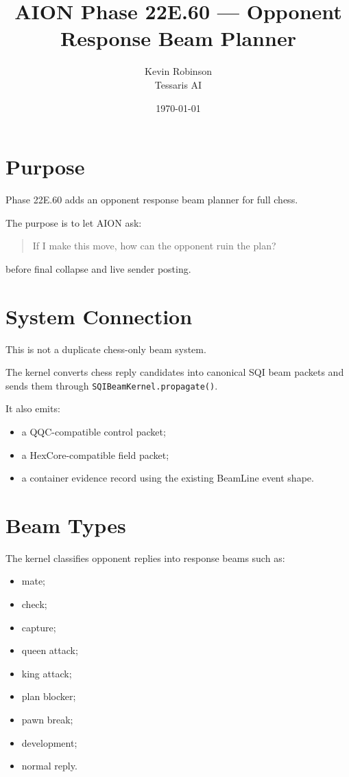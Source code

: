 \documentclass[11pt,a4paper]{article}
\title{\textbf{AION Phase 22E.60 --- Opponent Response Beam Planner}}
\author{Kevin Robinson\\Tessaris AI}
\date{\today}
\begin{document}
\maketitle

\section{Purpose}

Phase 22E.60 adds an opponent response beam planner for full chess.

The purpose is to let AION ask:

\begin{quote}
If I make this move, how can the opponent ruin the plan?
\end{quote}

before final collapse and live sender posting.

\section{System Connection}

This is not a duplicate chess-only beam system.

The kernel converts chess reply candidates into canonical SQI beam packets and sends them through \texttt{SQIBeamKernel.propagate()}.

It also emits:

\begin{itemize}
  \item a QQC-compatible control packet;
  \item a HexCore-compatible field packet;
  \item a container evidence record using the existing BeamLine event shape.
\end{itemize}

\section{Beam Types}

The kernel classifies opponent replies into response beams such as:

\begin{itemize}
  \item mate;
  \item check;
  \item capture;
  \item queen attack;
  \item king attack;
  \item plan blocker;
  \item pawn break;
  \item development;
  \item normal reply.
\end{itemize}
\end{document}
